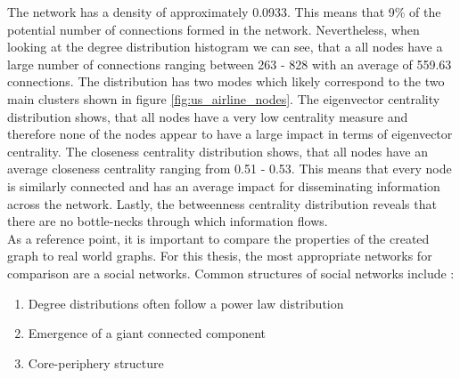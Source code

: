   \noindent The network has a density of approximately 0.0933. This means that 
  9\% of the potential number of connections formed in the network.
  Nevertheless, when looking at the degree distribution histogram we can see, 
  that a all nodes have a large number of connections ranging between 263 -
  828 with an average of 559.63 connections. The distribution has two
  modes which likely correspond to the two main clusters shown in figure
  \ref{fig:us_airline_nodes}. The eigenvector centrality distribution shows, 
  that all nodes have a very low centrality measure and therefore none of the 
  nodes appear to have a large impact in terms of eigenvector centrality. The 
  closeness centrality distribution shows, that all nodes have an average 
  closeness centrality ranging from 0.51 - 0.53. This means that every node is 
  similarly connected and has an average impact for disseminating information 
  across the network. Lastly, the betweenness centrality distribution reveals 
  that there are no bottle-necks through which information flows. \\

  \noindent As a reference point, it is important to compare the properties of
  the created graph to real world graphs. For this thesis, the most appropriate
  networks for comparison are a social networks. Common structures of social 
  networks include \citep{watts1998collective,newman2006structure,Newman2010,
  kim2012multiplicative}:

  \begin{enumerate}
    \item Degree distributions often follow a power law distribution
    \item Emergence of a giant connected component
    \item Core-periphery structure
  \end{enumerate}

